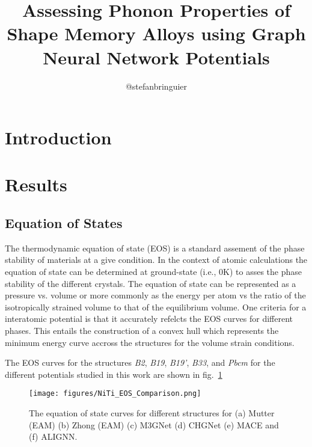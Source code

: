 \documentclass[twocolumn]{aastex631}
\begin{document}
\title{Assessing Phonon Properties of Shape Memory Alloys using Graph Neural Network Potentials}

\author{@stefanbringuier}

\begin{abstract}

\end{abstract}

\section{Introduction}
\label{sec:intro}


\section{Results}
\label{sec:results}
\subsection{Equation of States}
\label{subsec:eos}

The thermodynamic equation of state (EOS) is a standard assement of the phase stability of materials at a give condition. In the context of atomic calculations the equation of state can be determined at ground-state (i.e., 0K) to asses the phase stability of the different crystals. The equation of state can be represented as a pressure vs. volume or more commonly as the energy per atom  vs the ratio of the isotropically strained volume to that of the equilibrium volume. One criteria for a interatomic potential is that it accurately refelcts the EOS curves for different phases. This entails the construction of a convex hull which represents the minimum energy curve accross the structures for the volume strain conditions. \par

The EOS curves for the  structures \textit{B2}, \textit{B19}, \textit{B19'}, \textit{B33}, and \textit{Pbcm}  for the different potentials studied in this work are shown in fig.~\ref{fig:eos}
\begin{figure}[ht!]
    \begin{centering}
        \texttt{[image: figures/NiTi\_EOS\_Comparison.png]}
        \caption{
            The equation of state curves for different  structures for (a) Mutter (EAM) (b) Zhong (EAM) (c) M3GNet (d) CHGNet (e) MACE and (f) ALIGNN. 
        }
        \label{fig:eos}
    \end{centering}
\end{figure}
\end{document}
